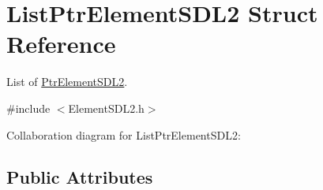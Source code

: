 \hypertarget{structListPtrElementSDL2}{}\section{List\+Ptr\+Element\+S\+D\+L2 Struct Reference}
\label{structListPtrElementSDL2}


List of \hyperlink{structPtrElementSDL2}{Ptr\+Element\+S\+D\+L2}.  




{\ttfamily \#include $<$Element\+S\+D\+L2.\+h$>$}



Collaboration diagram for List\+Ptr\+Element\+S\+D\+L2\+:
\subsection*{Public Attributes}

